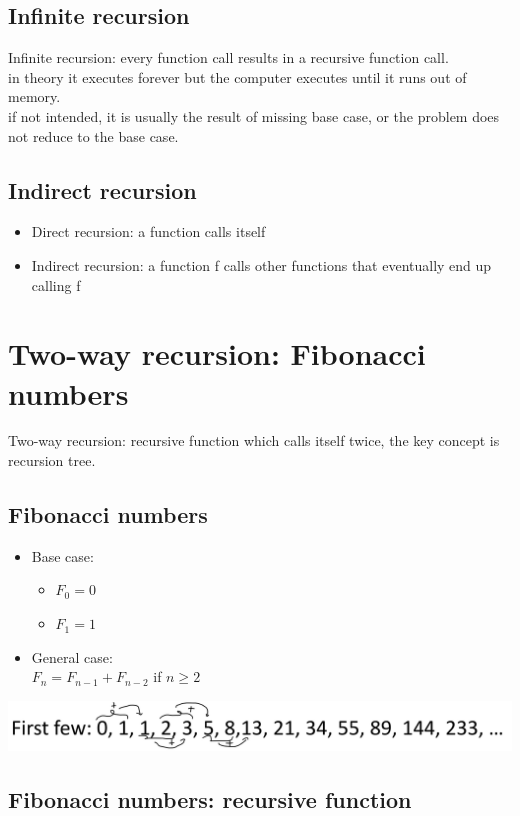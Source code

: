 \documentclass[12pt,oneside]{book}
\begin{document}
\subsection{Infinite recursion}
Infinite recursion: every function call results in a recursive function call.\\
in theory it executes forever but the computer executes until it runs out of memory.\\
if not intended, it is usually the result of missing base case, or the problem does not reduce to the base case.
\subsection{Indirect recursion}
\begin{itemize}
	\item Direct recursion: a function calls itself
	\item Indirect recursion: a function f calls other functions that eventually end up calling f
\end{itemize}
\pagebreak
\section{Two-way recursion: Fibonacci numbers}
Two-way recursion: recursive function which calls itself twice, the key concept is recursion  tree.\\
\subsection{Fibonacci numbers}
\begin{itemize}
	\item Base case:
	      \begin{itemize}
		      \item $F_0 = 0$
		      \item $F_1 = 1$
	      \end{itemize}
	\item General case: \\
	      $F_n = F_{n-1} + F_{n-2}$ if $n \geq 2$
\end{itemize}
\begin{center}
	\includegraphics[width=0.7\linewidth]{../pic/python/7.png}
\end{center}
\subsection{Fibonacci numbers: recursive function}
\end{document}
